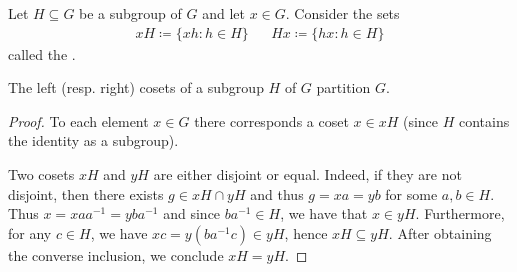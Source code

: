 \begin{definition}\label{def:group_cosets}
  Let \( H \subseteq G \) be a subgroup of \( G \) and let \( x \in G \). Consider the sets
  \begin{align*}
    xH \coloneqq \{ xh \colon h \in H \}
    &&
    Hx \coloneqq \{ hx \colon h \in H \}
  \end{align*}
  called the .
\end{definition}

\begin{proposition}\label{thm:coset_partition}
  The left (resp. right) cosets of a subgroup \( H \) of \( G \) partition \( G \).
\end{proposition}
\begin{proof}
  To each element \( x \in G \) there corresponds a coset \( x \in xH \) (since \( H \) contains the identity as a subgroup).

  Two cosets \( xH \) and \( yH \) are either disjoint or equal. Indeed, if they are not disjoint, then there exists \( g \in xH \cap yH \) and thus \( g = xa = yb \) for some \( a, b \in H \). Thus \( x = x a a^{-1} = y b a^{-1} \) and since \( b a^{-1} \in H \), we have that \( x \in yH \). Furthermore, for any \( c \in H \), we have \( xc = y(b a^{-1} c) \in yH \), hence \( xH \subseteq yH \). After obtaining the converse inclusion, we conclude \( xH = yH \).
\end{proof}

